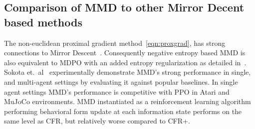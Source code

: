 \subsection{Comparison of MMD to other Mirror Decent based methods}

The non-euclidean proximal gradient method~\ref{eqn:proxgrad}, has strong connections to Mirror
Descent~\cite[Appendix D.3]{sokotaUnified2023}.
Consequently negative entropy based MMD is also equivalent to MDPO with an added entropy
regularization as detailed in~\cite[Appendix L]{sokotaUnified2023}.
Sokota et.~al~\cite{sokotaUnified2023} experimentally demonstrate MMD's strong performance in
single, and multi-agent settings by evaluating it against popular baselines.
In single agent settings MMD's performance is competitive with PPO in Atari and MuJoCo
environments.
MMD instantiated as a reinforcement learning algorithm performing behavioral form update at each
information state performs on the same level as CFR, but relatively worse compared to CFR+.
